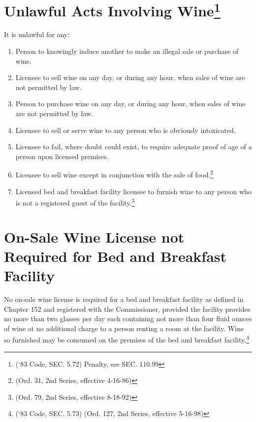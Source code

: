 \section{Unlawful Acts Involving Wine\footnote{(‘83 Code, SEC. 5.72)  Penalty, see SEC. 110.99}}
It is unlawful for any:
\begin{enumerate}[{\indent}A)]
    \item Person to knowingly induce another to make an illegal sale or purchase of wine.
    \item Licensee to sell wine on any day, or during any hour, when sales of wine are not permitted by law.
    \item Person to purchase wine on any day, or during any hour, when sales of wine are not permitted by law.
    \item Licensee to sell or serve wine to any person who is obviously intoxicated.
    \item Licensee to fail, where doubt could exist, to require adequate proof of age of a person upon licensed premises.
    \item Licensee to sell wine except in conjunction with the sale of food.\footnote{(Ord. 31, 2nd Series, effective 4-16-86)}
    \item Licensed bed and breakfast facility licensee to furnish wine to any person who is not a registered guest of the facility.\footnote{(Ord. 79, 2nd Series, effective 8-18-92)}
\end{enumerate}

\section{On-Sale Wine License not Required for Bed and Breakfast Facility}
No on-sale wine license is required for a bed and breakfast facility as defined in Chapter 152 and registered with the Commissioner, provided the facility provides no more than two glasses per day each containing not more than four fluid ounces of wine at no additional charge to a person renting a room at the facility.  Wine so furnished may be consumed on the premises of the bed and breakfast facility.\footnote{(‘83 Code, SEC. 5.73)  (Ord. 127, 2nd Series, effective 5-16-98)}\\


